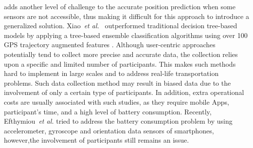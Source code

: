 adds another level of challenge to the accurate position prediction when some sensors are not accessible, thus making it difficult for this approach to introduce a generalized solution. Xiao~\textit{et al.}~\cite{xiao2017identifying} outperformed traditional decision tree-based models by applying a tree-based ensemble classification algorithms using over 100 GPS trajectory augmented features .
Although user-centric approaches potentially tend to collect more precise and accurate data, the collection relies upon a specific and limited number of participants. This makes such methods hard to implement in large scales and to address real-life transportation problems. Such data collection method may result in biased data due to the involvement of only a certain type of participants. In addition, extra operational costs are usually associated with such studies, as they require mobile Apps, participant's time, and a high level of battery consumption. Recently, Efthymiou~\textit{et al.} tried to address the battery consumption problem by using accelerometer, gyroscope and orientation data sensors of smartphones, however,the involvement of participants still remains an issue.
